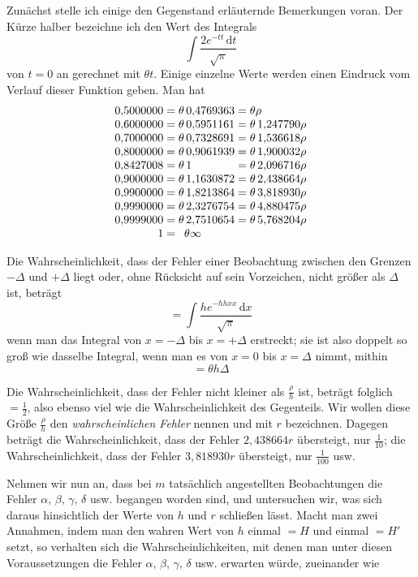 Zunächst stelle ich einige den Gegenstand erläuternde Bemerkungen voran. Der Kürze halber bezeichne ich den Wert des Integrals
\[
\int\frac{2e^{-tt}\,\mathrm{d}t}{\surd\pi}
\]
von \(t=0\) an gerechnet mit \(\theta t\). Einige einzelne Werte werden einen Eindruck vom Verlauf dieser Funktion geben. Man hat
\[
\begin{array}{r@{\;=\;}l@{\;=\;}l}
0{,}5000000&\theta\,0{,}4769363&\theta\rho\\
0{,}6000000&\theta\,0{,}5951161&\theta\,1{,}247790\rho\\
0{,}7000000&\theta\,0{,}7328691&\theta\,1{,}536618\rho\\
0{,}8000000&\theta\,0{,}9061939&\theta\,1{,}900032\rho\\
0{,}8427008&\theta\,1&\theta\,2{,}096716\rho\\
0{,}9000000&\theta\,1{,}1630872&\theta\,2{,}438664\rho\\
0{,}9900000&\theta\,1{,}8213864&\theta\,3{,}818930\rho\\
0{,}9990000&\theta\,2{,}3276754&\theta\,4{,}880475\rho\\
0{,}9999000&\theta\,2{,}7510654&\theta\,5{,}768204\rho\\
1&\multicolumn{2}{l}{\theta\infty}
\end{array}
\]

Die Wahrscheinlichkeit, dass der Fehler einer Beobachtung zwischen den Grenzen \(-\Delta\) und \(+\Delta\) liegt oder, ohne Rücksicht auf sein Vorzeichen, nicht größer als \(\Delta\) ist, beträgt
\[
=\int\frac{he^{-hhxx}\,\mathrm{d}x}{\surd\pi}
\]
wenn man das Integral von \(x=-\Delta\) bis \(x=+\Delta\) erstreckt; sie ist also doppelt so groß wie dasselbe Integral, wenn man es von \(x=0\) bis \(x=\Delta\) nimmt, mithin
\[
=\theta h\Delta
\]

Die Wahrscheinlichkeit, dass der Fehler nicht kleiner als \(\frac\rho h\) ist, beträgt folglich \(=\frac12\), also ebenso viel wie die Wahrscheinlichkeit des Gegenteils. Wir wollen diese Größe \(\frac\rho h\) den \textit{wahrscheinlichen Fehler} nennen und mit \(r\) bezeichnen. Dagegen beträgt die Wahrscheinlichkeit, dass der Fehler \(2{,}438664r\) übersteigt, nur \(\frac1{10}\); die Wahrscheinlichkeit, dass der Fehler \(3{,}818930r\) übersteigt, nur \(\frac1{100}\) usw.

Nehmen wir nun an, dass bei \(m\) tatsächlich angestellten Beobachtungen die Fehler \(\alpha,\,\beta,\,\gamma,\,\delta\) usw. begangen worden sind, und untersuchen wir, was sich daraus hinsichtlich der Werte von \(h\) und \(r\) schließen lässt. Macht man zwei %
Annahmen, indem man den wahren Wert von \(h\) einmal \(=H\) und einmal \(=H'\) setzt, so verhalten sich die Wahrscheinlichkeiten, mit denen man unter diesen Voraussetzungen die Fehler \(\alpha,\,\beta,\,\gamma,\,\delta\) usw. erwarten würde, zueinander wie

